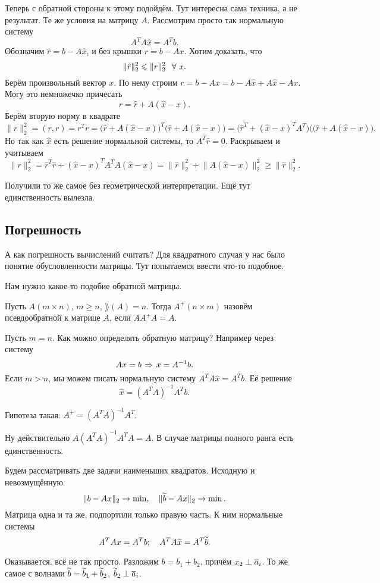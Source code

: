 Теперь с обратной стороны к этому подойдём. Тут интересна сама техника, а не результат. Те же условия на матрицу $A$. Рассмотрим просто так нормальную систему 
\[
  A^T A \hat x = A^T b.
\]
Обозначим $\hat r = b - A \hat x$, и без крышки $r = b - Ax$. Хотим доказать, что
\[
  \|\hat r\|^2_2\le \|r\|^2_2\pau\forall\ x.
\]
Берём произвольный вектор $x$. По нему строим $r = b- Ax = b-A\hat x + A \hat x - A x$. Могу это немножечко причесать
\[
  r = \hat r + A(\hat x - x).
\]
Берём вторую норму в квадрате
\[
  \|r\|^2_2 = (r,r) = r^T r = \big(\hat r + A(\hat x- x)\big)^T\big(\hat r + A(\hat x- x)\big) = 
 \big(\hat r^T + (\hat x - x)^T A^T\big)(\big(\hat r + A(\hat x - x)\big).
\]
Но так как $\hat x$ есть решение нормальной системы, то $A^T\hat r = 0$. Раскрываем и учитываем
\[
  \|r\|^2_2 = \hat r^T\hat r + (\hat x - x)^T A^T A(\hat x - x) = 
  \|\hat r\|^2_2 + \big\|A(\hat x-x)\big\|^2_2\ge \|\hat r\|^2_2.
\]

Получили то же самое без геометрической интерпретации. Ещё тут единственность вылезла.

\subsection{Погрешность}
А как погрешность вычислений считать? Для квадратного случая у нас было понятие обусловленности матрицы. Тут попытаемся ввести что-то подобное.

Нам нужно какое-то подобие обратной матрицы.
\begin{Def}
Пусть $A(m\times n)$, $m\ge n$, $\rang(A)=n$. Тогда $A^+(n\times m)$ назовём псевдообратной к матрице $A$, если $A A^+ A = A$.
\end{Def}

Пусть $m=n$. Как можно определять обратную матрицу? Например через систему
\[
  Ax = b\imp x = A^{-1}b.
\]
Если $m>n$, мы можем писать нормальную систему $A^T A\hat x = A^T b$. Её решение
\[
  \hat x = (A^T A)^{-1} A^T b.
\]

Гипотеза такая: $A^+ = (A^T A)^{-1}A^T$.

Ну действительно $A(A^T A)^{-1} A^T A = A$.
В случае матрицы полного ранга есть единственность.

Будем рассматривать две задачи наименьших квадратов. Исходную и невозмущённую.
\[
  \|b - Ax\|_2\rightarrow\min,\quad \|\widetilde{b}{} - Ax\|_2\rightarrow\min.
\]
Матрица одна и та же, подпортили только правую часть. К ним нормальные системы
\[
  A^T A x = A^T b;\quad A^T A\widetilde{x}{} = A^T \widetilde{b}{}.
\]

Оказывается, всё не так просто. Разложим $b = b_1+b_2$, причём $x_2\perp \overline{a}_i$. То же самое с волнами $\widetilde{b}{} = \widetilde{b}{}_1 + \widetilde{b}{}_2$, $\widetilde{b}{}_2\perp \overline{a}_i$.

